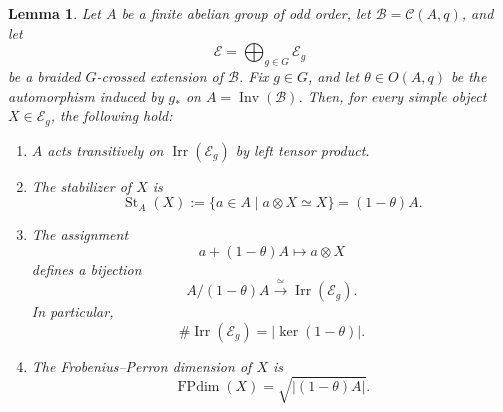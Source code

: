 \documentclass[12pt]{amsart}
\theoremstyle{plain}
\newtheorem{lemma}[theorem]{Lemma}
\theoremstyle{definition} %
\theoremstyle{remark} %
\newcommand{\cC}{\mathcal{C}}
\newcommand{\cB}{\mathcal{B}}
\newcommand{\cE}{\mathcal{E}}
\newcommand{\FPdim}{\operatorname{FPdim}}
\newcommand{\Inv}{\operatorname{Inv}}
\newcommand{\Irr}{\operatorname{Irr}}
\newcommand{\St}{\operatorname{St}}
\begin{document}
\begin{lemma}\label{lem:pointed_defect_sector}
Let $A$ be a finite abelian group of odd order, let $\cB=\cC(A,q)$, and let
\[
\cE=\bigoplus_{g\in G}\cE_g
\]
be a braided $G$-crossed extension of $\cB$. Fix $g\in G$, and let
$\theta\in O(A,q)$ be the automorphism induced by $g_*$ on
$A=\Inv(\cB)$. Then, for every simple object $X\in\cE_g$, the following hold:
\begin{enumerate}
\item $A$ acts transitively on $\Irr(\cE_g)$ by left tensor product.
\item The stabilizer of $X$ is
\[
\St_A(X):=\{a\in A\mid a\otimes X\simeq X\}=(1-\theta)A.
\]
\item The assignment
\[
a+(1-\theta)A\longmapsto a\otimes X
\]
defines a bijection
\[
A/(1-\theta)A \xrightarrow{\ \simeq\ } \Irr(\cE_g).
\]
In particular,
\[
\#\Irr(\cE_g)=|\ker(1-\theta)|.
\]
\item The Frobenius--Perron dimension of $X$ is
\[
\FPdim(X)=\sqrt{|(1-\theta)A|}.
\]
\end{enumerate}
\end{lemma}
\end{document}
